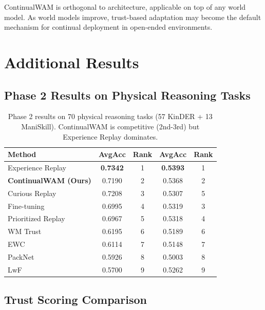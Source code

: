 \documentclass{article}
\begin{document}
ContinualWAM is orthogonal to architecture, applicable on top of any world model. As world models improve, trust-based adaptation may become the default mechanism for continual deployment in open-ended environments.




\appendix

\section{Additional Results}

\subsection{Phase 2 Results on Physical Reasoning Tasks}

\begin{table}[h]
\centering
\caption{Phase 2 results on 70 physical reasoning tasks (57 KinDER + 13 ManiSkill). ContinualWAM is competitive (2nd-3rd) but Experience Replay dominates.}
\label{tab:results}
\begin{tabular}{lcccc}
\toprule
Method & AvgAcc & Rank & AvgAcc & Rank \\
\midrule
Experience Replay & \textbf{0.7342} & 1 & \textbf{0.5393} & 1 \\
\textbf{ContinualWAM (Ours)} & 0.7190 & 2 & 0.5368 & 2 \\
Curious Replay & 0.7208 & 3 & 0.5307 & 5 \\
Fine-tuning & 0.6995 & 4 & 0.5319 & 3 \\
Prioritized Replay & 0.6967 & 5 & 0.5318 & 4 \\
WM Trust & 0.6195 & 6 & 0.5189 & 6 \\
EWC & 0.6114 & 7 & 0.5148 & 7 \\
PackNet & 0.5926 & 8 & 0.5003 & 8 \\
LwF & 0.5700 & 9 & 0.5262 & 9 \\
\bottomrule
\end{tabular}
\end{table}

\subsection{Trust Scoring Comparison}
\end{document}
